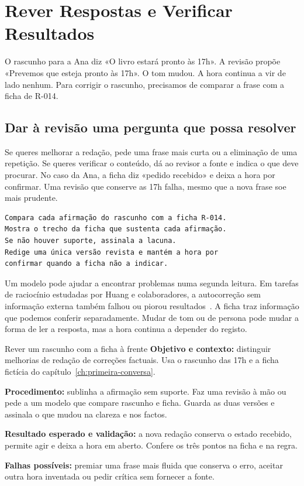 \chapter{Rever Respostas e Verificar Resultados}
\label{ch:autocorrecao}

\ficcao O rascunho para a Ana diz «O livro estará pronto às 17h». A revisão propõe «Prevemos que esteja pronto às 17h». O tom mudou. A hora continua a vir de lado nenhum. Para corrigir o rascunho, precisamos de comparar a frase com a ficha de R-014.

\section{Dar à revisão uma pergunta que possa resolver}

Se queres melhorar a redação, pede uma frase mais curta ou a eliminação de uma repetição. Se queres verificar o conteúdo, dá ao revisor a fonte e indica o que deve procurar. No caso da Ana, a ficha diz «pedido recebido» e deixa a hora por confirmar. Uma revisão que conserve as 17h falha, mesmo que a nova frase soe mais prudente.

\begin{lstlisting}
Compara cada afirmação do rascunho com a ficha R-014.
Mostra o trecho da ficha que sustenta cada afirmação.
Se não houver suporte, assinala a lacuna.
Redige uma única versão revista e mantém a hora por
confirmar quando a ficha não a indicar.
\end{lstlisting}

Um modelo pode ajudar a encontrar problemas numa segunda leitura. Em tarefas de raciocínio estudadas por Huang e colaboradores, a autocorreção sem informação externa também falhou ou piorou resultados~\citep{huang2024}. A ficha traz informação que podemos conferir separadamente. Mudar de tom ou de persona pode mudar a forma de ler a resposta, mas a hora continua a depender do registo.

\begin{promptlabbox}{Rever um rascunho com a ficha à frente}
\textbf{Objetivo e contexto:} distinguir melhorias de redação de correções factuais. Usa o rascunho das 17h e a ficha fictícia do capítulo~\ref{ch:primeira-conversa}.

\textbf{Procedimento:} sublinha a afirmação sem suporte. Faz uma revisão à mão ou pede a um modelo que compare rascunho e ficha. Guarda as duas versões e assinala o que mudou na clareza e nos factos.

\textbf{Resultado esperado e validação:} a nova redação conserva o estado recebido, permite agir e deixa a hora em aberto. Confere os três pontos na ficha e na regra.

\textbf{Falhas possíveis:} premiar uma frase mais fluida que conserva o erro, aceitar outra hora inventada ou pedir crítica sem fornecer a fonte.
\end{promptlabbox}

